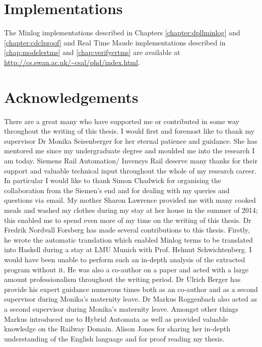 \section{Implementations}
The Minlog implementations described in Chapters \ref{chapter:dpllminlog} and \ref{chapter:cdclproof} and Real Time Maude implementations described in \ref{chap:modelertms} and \ref{chap:verifyertms} are available at \url{http://cs.swan.ac.uk/~csal/phd/index.html}.

\section{Acknowledgements}
There are a great many who have supported me or contributed in some way throughout the writing of this thesis. I would first and foremost like to thank my supervisor Dr Monika Seisenberger for her eternal patience and guidance. She has mentored me since my undergraduate degree and moulded me into the research I am today. Siemens Rail Automation/ Invensys Rail deserve many thanks for their support and valuable technical input throughout the whole of my research career. In particular I would like to thank Simon Chadwick for organising the collaboration from the Siemen's end and for dealing with my queries and questions via email. My mother Sharon Lawrence provided me with many cooked meals and washed my clothes during my stay at her house in the summer of 2014; this enabled me to spend even more of my time on the writing of this thesis.
Dr Fredrik Nordvall Forsberg has made several contributions to this thesis. Firstly, he wrote the automatic translation which enabled Minlog terms to be translated into Haskell during a stay at  LMU Munich with Prof. Helmut Schwichtenberg.  I would have been unable to perform such an in-depth analysis of the extracted program without it. He was also a co-author on a paper and acted with a large amount professionalism throughout the writing period. Dr Ulrich Berger has provide his expert guidance numerous times both as an co-author and as a second supervisor during Monika's maternity leave. Dr Markus Roggenbach also acted as a second supervisor during Monika's maternity leave. Amongst other things Markus introduced me to Hybrid Automata as well as provided valuable knowledge on the Railway Domain.  Alison Jones for sharing her in-depth understanding of the English language and for proof reading my thesis.


